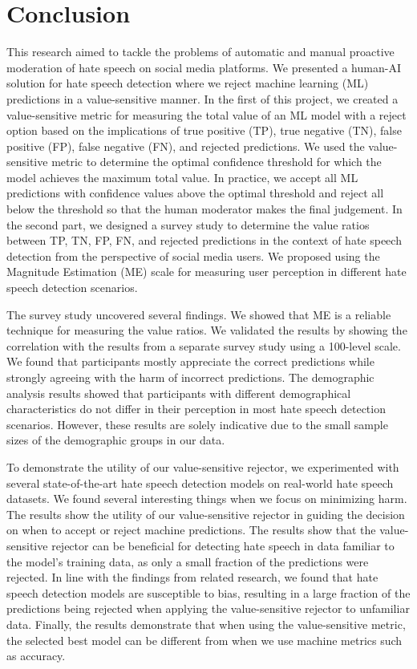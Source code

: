 \chapter{Conclusion}
\label{ch:conclusion}
This research aimed to tackle the problems of automatic and manual proactive moderation of hate speech on social media platforms.
%
We presented a human-AI solution for hate speech detection where we reject machine learning (ML) predictions in a value-sensitive manner.
%
In the first of this project, we created a value-sensitive metric for measuring the total value of an ML model with a reject option based on the implications of true positive (TP), true negative (TN), false positive (FP), false negative (FN), and rejected predictions.
%
We used the value-sensitive metric to determine the optimal confidence threshold for which the model achieves the maximum total value.
%
In practice, we accept all ML predictions with confidence values above the optimal threshold and reject all below the threshold so that the human moderator makes the final judgement.
%
In the second part, we designed a survey study to determine the value ratios between TP, TN, FP, FN, and rejected predictions in the context of hate speech detection from the perspective of social media users.
%
We proposed using the Magnitude Estimation (ME) scale for measuring user perception in different hate speech detection scenarios.
%

%
The survey study uncovered several findings.
%
We showed that ME is a reliable technique for measuring the value ratios.
%
We validated the results by showing the correlation with the results from a separate survey study using a 100-level scale.
%
We found that participants mostly appreciate the correct predictions while strongly agreeing with the harm of incorrect predictions.
%
The demographic analysis results showed that participants with different demographical characteristics do not differ in their perception in most hate speech detection scenarios.
%
However, these results are solely indicative due to the small sample sizes of the demographic groups in our data.
%

%
To demonstrate the utility of our value-sensitive rejector, we experimented with several state-of-the-art hate speech detection models on real-world hate speech datasets.
%
We found several interesting things when we focus on minimizing harm.
%
The results show the utility of our value-sensitive rejector in guiding the decision on when to accept or reject machine predictions.
%
The results show that the value-sensitive rejector can be beneficial for detecting hate speech in data familiar to the model's training data, as only a small fraction of the predictions were rejected.
%
In line with the findings from related research, we found that hate speech detection models are susceptible to bias, resulting in a large fraction of the predictions being rejected when applying the value-sensitive rejector to unfamiliar data.
%
Finally, the results demonstrate that when using the value-sensitive metric, the selected best model can be different from when we use machine metrics such as accuracy.
%
